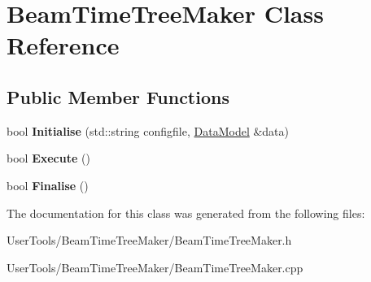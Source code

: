 \hypertarget{classBeamTimeTreeMaker}{
\section{BeamTimeTreeMaker Class Reference}
\label{classBeamTimeTreeMaker}
}
\subsection*{Public Member Functions}
\begin{DoxyCompactItemize}
\item 
\hypertarget{classBeamTimeTreeMaker_ad0ff2ecf3cf282fc854c086f2bd6902e}{
bool {\bfseries Initialise} (std::string configfile, \hyperlink{classDataModel}{DataModel} \&data)}
\label{classBeamTimeTreeMaker_ad0ff2ecf3cf282fc854c086f2bd6902e}

\item 
\hypertarget{classBeamTimeTreeMaker_a9d8457a840bbd05785c6dbad41efc3e9}{
bool {\bfseries Execute} ()}
\label{classBeamTimeTreeMaker_a9d8457a840bbd05785c6dbad41efc3e9}

\item 
\hypertarget{classBeamTimeTreeMaker_aa854478ff70ed002e41ed38e18fe4a25}{
bool {\bfseries Finalise} ()}
\label{classBeamTimeTreeMaker_aa854478ff70ed002e41ed38e18fe4a25}

\end{DoxyCompactItemize}


The documentation for this class was generated from the following files:\begin{DoxyCompactItemize}
\item 
UserTools/BeamTimeTreeMaker/BeamTimeTreeMaker.h\item 
UserTools/BeamTimeTreeMaker/BeamTimeTreeMaker.cpp\end{DoxyCompactItemize}
